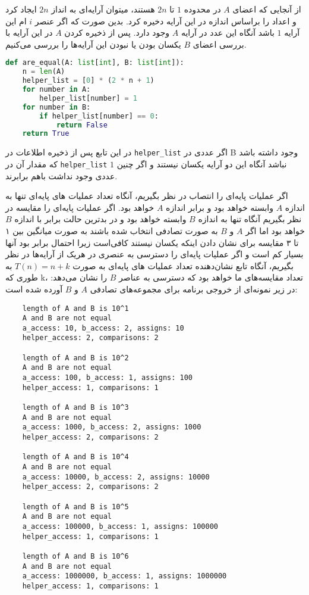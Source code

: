 \documentclass[]{article}
\begin{document}
از آنجایی که اعضای $A$ در محدوده $1$ تا $2n$ هستند،
میتوان آرایه‌ای به انداز $2n$ ایجاد کرد
و اعداد را براساس اندازه در این آرایه دخیره کرد. بدین صورت که اگر عنصر $i$ ام
این آرایه $1$ باشد آنگاه این عدد در آرایه $A$ وجود دارد.
پس از ذخیره کردن $A$ در این آرایه با بررسی اعضای $B$
یکسان بودن یا نبودن این آرایه‌ها را بررسی می‌کنیم.

\begin{latin}
\begin{lstlisting}[language=python]
def are_equal(A: list[int], B: list[int]):
    n = len(A)
    helper_list = [0] * (2 * n + 1)
    for number in A:
        helper_list[number] = 1
    for number in B:
        if helper_list[number] == 0:
            return False
    return True
\end{lstlisting}
\end{latin}
در این تابع پس از ذخیره اطلاعات در \texttt{helper\_list}
اگر عددی در B وجود داشته باشد که مقدار آن در \texttt{helper\_list}
$1$ نباشد آنگاه این دو آرایه یکسان نیستند و اگر چنین عددی وجود نداشت باهم برابرند.

اگر عملیات پایه‌ای را انتصاب در نظر بگیریم، آنگاه تعداد عملیات های پایه‌ای تنها به اندازه $A$
وابسته خواهد بود و برابر اندازه $A$ خواهد بود.
اگر عملیات پایه‌ای را مقایسه در نظر بگیریم آنگاه تنها به اندازه $B$ وابسته خواهد بود و
در بدترین حالت برابر با اندازه $B$ خواهد بود اما اگر $A$ و $B$
به صورت تصادفی انتخاب شده باشند به صورت میانگین بین ۱ تا ۳ مقایسه برای نشان دادن اینکه
یکسان نیستند کافی‌است زیرا احتمال برابر بود آنها بسیار کم است و اگر عملیات پایه‌ای را
دسترسی به عنصری در هریک از آرایه‌ها در نظر بگیریم، آنگاه تابع نشان‌دهنده تعداد عملیات های پایه‌ای به صورت
$T(n) = n + k$
به طوری که k، تعداد مقایسه‌های ما خواهد بود که دسترسی به عناصر $B$ را نشان می‌دهد:
در زیر نمونه‌ای از خروجی برنامه برای مجموعه‌های تصادفی $A$ و $B$ آورده شده است:
\pagebreak
\begin{latin}
\begin{lstlisting}
    length of A and B is 10^1
    A and B are not equal
    a_access: 10, b_access: 2, assigns: 10
    helper_access: 2, comparisons: 2
    
    length of A and B is 10^2
    A and B are not equal
    a_access: 100, b_access: 1, assigns: 100
    helper_access: 1, comparisons: 1
    
    length of A and B is 10^3
    A and B are not equal
    a_access: 1000, b_access: 2, assigns: 1000
    helper_access: 2, comparisons: 2
    
    length of A and B is 10^4
    A and B are not equal
    a_access: 10000, b_access: 2, assigns: 10000
    helper_access: 2, comparisons: 2
    
    length of A and B is 10^5
    A and B are not equal
    a_access: 100000, b_access: 1, assigns: 100000
    helper_access: 1, comparisons: 1
    
    length of A and B is 10^6
    A and B are not equal
    a_access: 1000000, b_access: 1, assigns: 1000000
    helper_access: 1, comparisons: 1
\end{lstlisting}
\end{latin}
\end{document}
